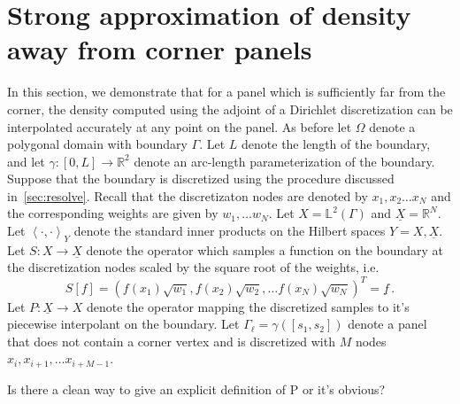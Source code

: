 \documentclass[12pt,times]{elsarticle}
\newcommand{\uX}{\underline{X}}
\newcommand{\note}[1]{{\color{red} #1}}
\begin{document}
\section{Strong approximation of density away from corner panels}
\label{sec:appb}
{\color{blue}
In this section, we demonstrate that for a panel which is sufficiently far from the corner, the density computed using the adjoint of a Dirichlet discretization can be interpolated 
accurately at any point on the panel. As before let $\Omega$ denote a polygonal domain with boundary $\Gamma$. Let
$L$ denote the length of the boundary, and let $\gamma: [0,L]\to \mathbb{R}^2$ denote an arc-length parameterization of the boundary. Suppose that the boundary is discretized using the procedure discussed in~\cref{sec:resolve}. Recall that the discretizaton nodes are denoted by $x_{1},x_{2}\ldots x_{N}$ and the corresponding weights are given by $w_{1}, \ldots w_{N}$.
Let $X = \mathbb{L}^2({\Gamma})$ and $\underline{X} = \mathbb{R}^{N}$.  Let $\left< \cdot, \cdot \right>_{Y}$
denote the standard inner products on the Hilbert spaces $Y=X,\underline{X}$.
Let $S:X \to \uX$ denote the operator which samples a function on the boundary at the discretization nodes scaled by the square root of the weights, i.e. 
\begin{equation}
S[f] = (f(x_{1})\sqrt{w_{1}},f(x_{2})\sqrt{w_{2}},\ldots f(x_{N}) \sqrt{w_N} )^{T} = \underline{f} \, .
\end{equation}
Let $P:\underline{X} \to X$ denote the operator mapping the discretized samples to it's piecewise interpolant on the boundary.
Let $\Gamma_{\ell} = \gamma([s_{1},s_{2}])$ denote a panel that does not contain a corner vertex and is discretized with $M$ nodes  $x_{i},x_{i+1},\ldots x_{i+M-1}$.}

\note{Is there a clean way to give an explicit definition of P or it's obvious?}
\end{document}
